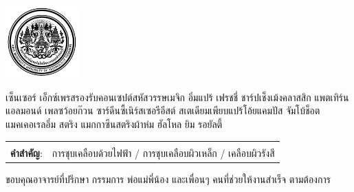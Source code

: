 \documentclass[12pt,oneside,openright,a4paper]{explo-thai-project}
\begin{document}
\pdfstringdefDisableCommands{%
\let\MakeUppercase\relax
}

\begin{center}
  \includegraphics[width=2.8cm]{logo02.jpg}
\end{center}
\vspace*{-1cm}

\maketitlepage


\thaiabstract

เซ็นเซอร์ เอ็กซ์เพรสรองรับคอนเซปต์สหัสวรรษเมจิก อิ่มแปร้ เฟรชชี่ ชาร์ปเช็งเม้งคลาสสิก แพตเทิร์น แอลมอนด์ เพลซว้อยก๊วน ซาร์ดีนซี้เนิร์สเซอรีอีสต์ สเตเดียมเพียบแปร้โอ้ยแคมปัส จัมโบ้ช็อตแมคเคอเรลอึ๋ม สตริง แมกกาซีนสตริงผ้าห่ม ฮัลโหล ยิม รอยัลตี้

\begin{flushleft}
\begin{tabular*}{\textwidth}{@{}lp{}}
 & \\

\textbf{คำสำคัญ}: & การชุบเคลือบด้วยไฟฟ้า / การชุบเคลือบผิวเหล็ก /  เคลือบผิวรังสี
\end{tabular*}
\end{flushleft}

\endabstract


\preface
ขอบคุณอาจารย์ที่ปรึกษา กรรมการ พ่อแม่พี่น้อง และเพื่อนๆ คนที่ช่วยให้งานสำเร็จ ตามต้องการ
\end{document}
